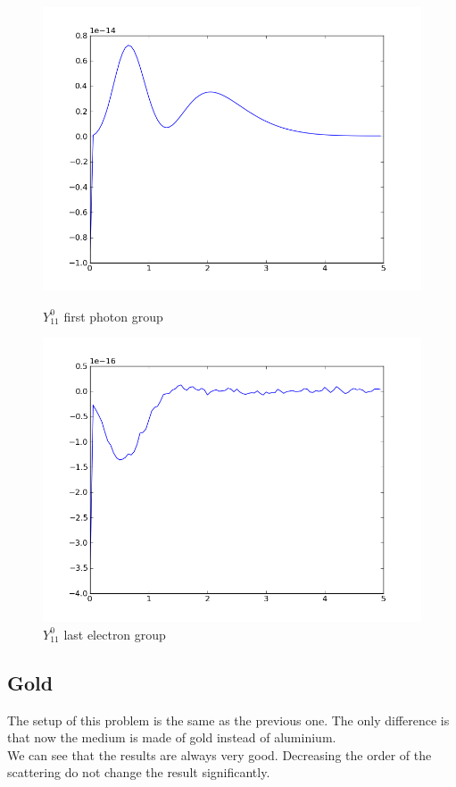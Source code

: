\begin{figure}[H]
\begin{minipage}[b]{0.45\linewidth}
\centering
\includegraphics[width=\linewidth]{./images/al/group_0_moment_142}
\caption{$Y_{11}^0$ first photon group}
\end{minipage}
\hspace{0.5cm}
\begin{minipage}[b]{0.45\linewidth}
\centering
\includegraphics[width=\linewidth]{./images/al/group_39_moment_142}
\caption{$Y_{11}^0$ last electron group}
\end{minipage}
\end{figure}

\subsection{Gold}
The setup of this problem is the same as the previous one. The only difference
is that now the medium is made of gold instead of aluminium.\\
We can see that the results are always very good. Decreasing the order of the
scattering do not change the result significantly.
